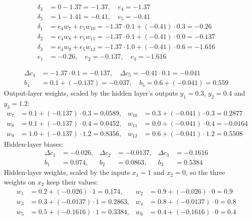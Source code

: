\begin{align*}
  \delta_4 &= 0 - 1.37 = -1.37, \quad e_4 = -1.37 \\
  \delta_5 &= 1 - 1.41 = -0.41, \quad e_5 = -0.41 \\
  \delta_1 &= e_4 w_7 + e_5 w_{10} = -1.37 \cdot 0.1 + (-0.41) \cdot 0.3 = -0.26 \\
  \delta_2 &= e_4 w_8 + e_5 w_{11} = -1.37 \cdot 0.1 + (-0.41) \cdot 0.0 = -0.137 \\
  \delta_3 &= e_4 w_9 + e_5 w_{12} = -1.37 \cdot 1.0 + (-0.41) \cdot 0.6 = -1.616 \\
  e_1 &= -0.26, \quad e_2 = -0.137, \quad e_3 = -1.616
\end{align*}

\begin{align*}
  \Delta c_4 &= -1.37 \cdot 0.1 = -0.137, \quad \Delta c_5 = -0.41 \cdot 0.1 = -0.041 \\
  b_4 &= 0.1 + (-0.137) = -0.037, \quad b_5 = 0.6 + (-0.041) = 0.559
\end{align*}
Output-layer weights, scaled by the hidden layer's outputs $y_1 = 0.3$, $y_2 = 0.4$ and
$y_3 = 1.2$:
\begin{align*}
  w_7 &= 0.1 + (-0.137) \cdot 0.3 = 0.0589, & w_{10} &= 0.3 + (-0.041) \cdot 0.3 = 0.2877 \\
  w_8 &= 0.1 + (-0.137) \cdot 0.4 = 0.0452, & w_{11} &= 0.0 + (-0.041) \cdot 0.4 = -0.0164 \\
  w_9 &= 1.0 + (-0.137) \cdot 1.2 = 0.8356, & w_{12} &= 0.6 + (-0.041) \cdot 1.2 = 0.5508
\end{align*}
Hidden-layer biases:
\begin{align*}
  \Delta c_1 &= -0.026, & \Delta c_2 &= -0.0137, & \Delta c_3 &= -0.1616 \\
  b_1 &= 0.074, & b_2 &= 0.0863, & b_3 &= 0.5384
\end{align*}
Hidden-layer weights, scaled by the inputs $x_1 = 1$ and $x_2 = 0$, so the three weights on $x_2$
keep their values:
\begin{align*}
  w_1 &= 0.2 + (-0.026) \cdot 1 = 0.174, & w_2 &= 0.9 + (-0.026) \cdot 0 = 0.9 \\
  w_3 &= 0.3 + (-0.0137) \cdot 1 = 0.2863, & w_4 &= 0.8 + (-0.0137) \cdot 0 = 0.8 \\
  w_5 &= 0.5 + (-0.1616) \cdot 1 = 0.3384, & w_6 &= 0.4 + (-0.1616) \cdot 0 = 0.4
\end{align*}

